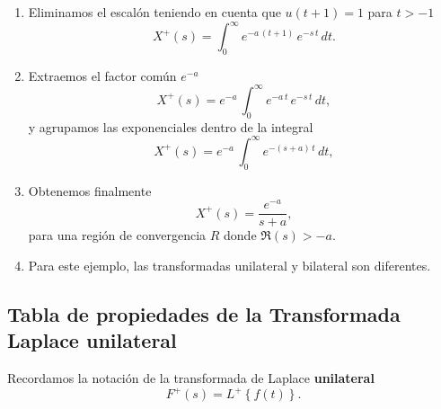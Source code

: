 \begin{enumerate}
\item Eliminamos el escal\'{o}n teniendo en cuenta que $u(t+1) = 1$ para $t>-1$
\begin{equation}
  X^{+}(s) = \int_{0}^{\infty} e^{-a \, (t+1)} \, e^{-s \, t} \, dt.
\end{equation}

\item Extraemos el factor común $e^{-a}$ 
\begin{equation}
  X^{+}(s) = e^{-a} \, \int_{0}^{\infty} e^{-a \, t} \, e^{-s \, t} \, dt,
\end{equation}
y agrupamos las exponenciales dentro de la integral
\begin{equation}
  X^{+}(s) = e^{-a} \, \int_{0}^{\infty} e^{-(s + a) \, t} \, dt,
\end{equation}

\item Obtenemos finalmente
\begin{equation}
  X^{+}(s) =  \frac{e^{-a}}{s+a},
\end{equation}
para una región de convergencia $R$ donde $\Re(s) > -a$.

\item Para este ejemplo, las transformadas unilateral y bilateral son diferentes.

\end{enumerate}

\subsection{Tabla de propiedades de la Transformada Laplace unilateral}

Recordamos la notaci\'{o}n de la transformada de Laplace \textbf{unilateral} 
\begin{equation}
  F^{+}\left( s\right) = L^{+}\left\{ f (t) \right\}.
\end{equation}

